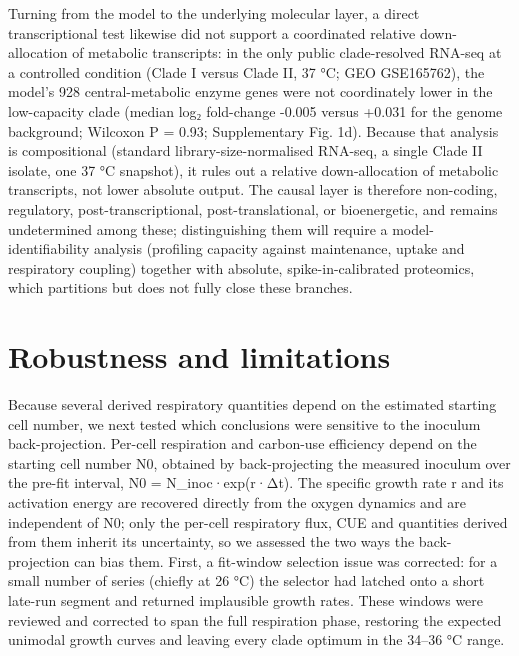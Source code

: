 \documentclass[
]{article}
\begin{document}
Turning from the model to the underlying molecular layer, a direct
transcriptional test likewise did not support a coordinated relative
down-allocation of metabolic transcripts: in the only public
clade-resolved RNA-seq at a controlled condition (Clade I versus Clade
II, 37 °C; GEO GSE165762), the model's 928 central-metabolic enzyme
genes were not coordinately lower in the low-capacity clade (median log₂
fold-change -0.005 versus +0.031 for the genome background; Wilcoxon P =
0.93; Supplementary Fig. 1d). Because that analysis is compositional
(standard library-size-normalised RNA-seq, a single Clade II isolate,
one 37 °C snapshot), it rules out a relative down-allocation of
metabolic transcripts, not lower absolute output. The causal layer is
therefore non-coding, regulatory, post-transcriptional,
post-translational, or bioenergetic, and remains undetermined among
these; distinguishing them will require a model-identifiability analysis
(profiling capacity against maintenance, uptake and respiratory
coupling) together with absolute, spike-in-calibrated proteomics, which
partitions but does not fully close these branches.

\section{\texorpdfstring{\textbf{Robustness and
limitations}}{Robustness and limitations}}\label{robustness-and-limitations}

Because several derived respiratory quantities depend on the estimated
starting cell number, we next tested which conclusions were sensitive to
the inoculum back-projection. Per-cell respiration and carbon-use
efficiency depend on the starting cell number N0, obtained by
back-projecting the measured inoculum over the pre-fit interval, N0 =
N\_inoc·exp(r·Δt). The specific growth rate r and its activation energy
are recovered directly from the oxygen dynamics and are independent of
N0; only the per-cell respiratory flux, CUE and quantities derived from
them inherit its uncertainty, so we assessed the two ways the
back-projection can bias them. First, a fit-window selection issue was
corrected: for a small number of series (chiefly at 26 °C) the selector
had latched onto a short late-run segment and returned implausible
growth rates. These windows were reviewed and corrected to span the full
respiration phase, restoring the expected unimodal growth curves and
leaving every clade optimum in the 34--36 °C range.
\end{document}
